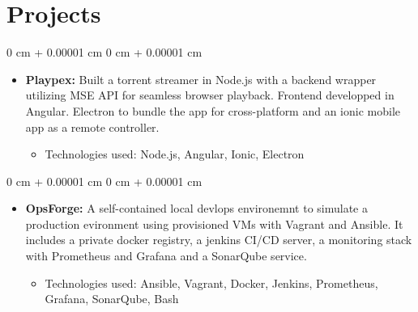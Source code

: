 \documentclass[10pt, letterpaper]{article}
\newenvironment{highlights}{
  \begin{itemize}[
    topsep=0.10 cm,
    parsep=0.10 cm,
    partopsep=0pt,
    itemsep=0pt,
    leftmargin=0 cm + 10pt
    ]
  }{
\end{itemize}
}
\newenvironment{highlightsforbulletentries}{
  \begin{itemize}[
    topsep=0.10 cm,
    parsep=0.10 cm,
    partopsep=0pt,
    itemsep=0pt,
    leftmargin=10pt
    ]
  }{
\end{itemize}
} %
\newenvironment{onecolentry}{
  \begin{adjustwidth}{
      0 cm + 0.00001 cm
    }{
      0 cm + 0.00001 cm
    }
  }{
  \end{adjustwidth}
} %
\begin{document}

  \section{Projects}



  \begin{onecolentry}
    \begin{highlights}
    \item \textbf{Playpex: } Built a torrent streamer in Node.js with a backend wrapper utilizing MSE API for seamless browser playback. Frontend developped in Angular. Electron to bundle the app for cross-platform and an ionic mobile app as a remote controller.

                \begin{highlightsforbulletentries}
    \item Technologies used: Node.js, Angular, Ionic, Electron
    \end{highlightsforbulletentries}

    \end{highlights}
  \end{onecolentry}
  \vspace{0.2 cm}

    \begin{onecolentry}
    \begin{highlights}
    \item \textbf{OpsForge: } A self-contained local devlops environemnt to simulate a production evironment using provisioned VMs with Vagrant and Ansible. It includes a private docker registry, a jenkins CI/CD server, a monitoring stack with Prometheus and Grafana and a SonarQube service. 

                \begin{highlightsforbulletentries}
    \item Technologies used: Ansible, Vagrant, Docker, Jenkins, Prometheus, Grafana, SonarQube, Bash
    \end{highlightsforbulletentries}

    \end{highlights}
  \end{onecolentry}

  \vspace{0.2 cm}
\end{document}
